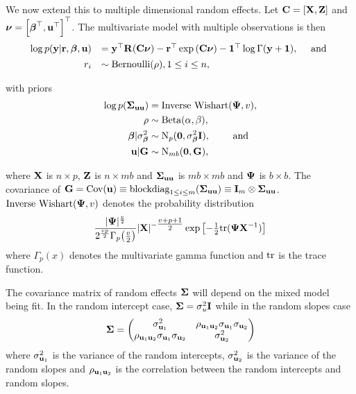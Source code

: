 \noindent We now extend this to multiple dimensional random effects. Let ${\bf C} =
[{\bf X}, {\bf Z}]$ and ${\boldsymbol \nu} = \left[ {\boldsymbol \beta}^\top, {\bf u}^\top \right]^\top$. The
multivariate model with multiple observations is then 
\begin{equation*}
    \begin{array}{rl} \log{p({\bf y}|{\bf r}, {\boldsymbol\beta}, {\bf u})} &= {\bf y}^\top {\bf R} ({\bf C}{\boldsymbol \nu})
        - {\bf r}^\top \exp{({\bf C}{\boldsymbol\nu})} - {\bf 1}^\top \log{\Gamma{({\bf y}+ {\bf1})}},
        \quad \mbox{ and } \\
        [1ex] r_i& \sim \text{Bernoulli}(\rho), 1 \leq i \leq n, \\ 
    \end{array} 
\end{equation*}

\noindent with priors
\begin{align*}
	\log{p({\boldsymbol\Sigma}_{{\bf u}{\bf u}})} & = \text{Inverse Wishart}({\boldsymbol \Psi}, v),    \\
	\rho                       & \sim \text{Beta}(\alpha, \beta),             \\
	{\boldsymbol \beta}|\sigma^2_{\boldsymbol \beta}     & \sim \text{N}_p({\bf 0}, \sigma^2_{\boldsymbol \beta} {\bf I}), \qquad  \text{ and } \\
	{\bf u}|{\bf G}       & \sim \text{N}_{mb}({\bf 0}, {\bf G}),             
\end{align*}

\noindent where ${\bf X}$ is $n \times p$, ${\bf Z}$ is $n \times mb$ and ${\boldsymbol \Sigma}_{{\bf u}
{\bf u}}$ is $mb \times mb$ and ${\boldsymbol \Psi}$ is $b \times b$. The covariance of ${\bf G} =
\mbox{Cov}({\bf u}) \equiv \text{blockdiag}_{1 \leq i \leq m} ({\boldsymbol \Sigma}_{{\bf u} {\bf u}}) \equiv {\bf I}_m
\otimes {\boldsymbol\Sigma}_{{\bf u} {\bf u}}$. $\text{Inverse Wishart}({\boldsymbol \Psi}, v)$ denotes the
probability distribution
\begin{equation*}
\displaystyle \frac{|{\boldsymbol \Psi}|^\frac{v}{2}}{2^{\frac{vp}{2}}
\Gamma_p{\left(\tfrac{v}{2}\right)}} |{\bf X}|^{-\tfrac{v + p + 1}{2}}
\exp{\left[-\tfrac{1}{2} \text{tr}{({\boldsymbol\Psi}{\bf X}^{-1})}\right]}
\end{equation*}
where $\Gamma_p{(x)}$ denotes the multivariate gamma function and $\text{tr}$ is the
trace function.

The covariance matrix of random effects ${\boldsymbol \Sigma}$ will depend on the mixed
model being fit. In the random intercept case, ${\boldsymbol \Sigma} = \sigma_u^2 {\bf I}$ while
in the random slopes case
\[
	{\boldsymbol \Sigma} = 
	\begin{pmatrix}
		\sigma_{{\bf u}_1}^2                                 & \rho_{{\bf u}_1 {\bf u}_2} \sigma_{{\bf u}_1} \sigma_{{\bf u}_2} \\
		\rho_{{\bf u}_1 {\bf u}_2} \sigma_{{\bf u}_1} \sigma_{{\bf u}_2} & \sigma_{{\bf u}_2}^2                                 
	\end{pmatrix}
\]
where $\sigma_{{\bf u}_1}^2$ is the variance of the random intercepts,
$\sigma_{{\bf u}_2}^2$ is the variance of the random slopes and $\rho_{{\bf u}_1
{\bf u}_2}$ is the correlation between the random intercepts and random slopes.

